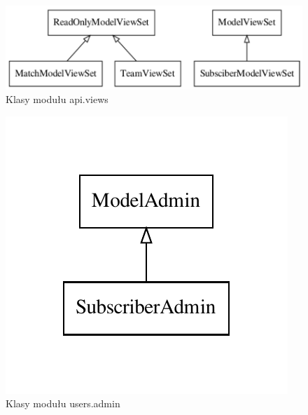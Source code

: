 \documentclass[11pt,a4paper]{article}
\begin{document}
    \begin{figure}[!h]
        \begin{center}
            \includegraphics[width=\textwidth]{images/classes_api_views.pdf}
        \end{center}
        \caption{Klasy modułu api.views}
    \end{figure}

    \newpage

    \begin{figure}[!h]
        \begin{center}
            \includegraphics{images/classes_users_admin.pdf}
        \end{center}
        \caption{Klasy modułu users.admin}
    \end{figure}
\end{document}
